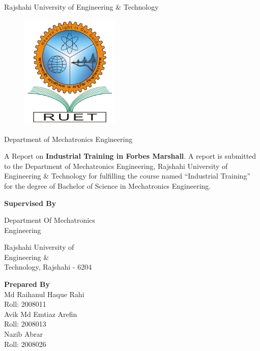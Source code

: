 \begin{center}
    Rajshahi University of Engineering \& Technology
\end{center}
\begin{figure}[h!]
    \centering
    \includegraphics[width=4.7cm]{figs/RUET.png}
    \label{fig:ruet1}
\end{figure}

\begin{center}
    Department of Mechatronics Engineering
\end{center}
\setlength{\columnsep}{0.1\textwidth}
\noindent A Report on \textbf{Industrial Training in Forbes Marshall}. A report is submitted to the Department of Mechatronics Engineering, Rajshahi University of Engineering \& Technology for fulfilling the course named “Industrial Training” for the degree of Bachelor of Science in Mechatronics Engineering.

\begin{center}
    \begin{multicols}{2}
        \noindent \textbf{Supervised By}


        \noindent Department Of Mechatronics\\
        Engineering

        \noindent Rajshahi University of\\
        Engineering \&\\
        Technology, Rajshahi - 6204
        \columnbreak

        \noindent \textbf{Prepared By}\\
        Md Raihanul Haque Rahi\\
        Roll: 2008011\\

        \noindent Avik Md Emtiaz Arefin\\
        Roll: 2008013\\

        \noindent Nazib Abrar\\
        Roll: 2008026\\


    \end{multicols}
\end{center}